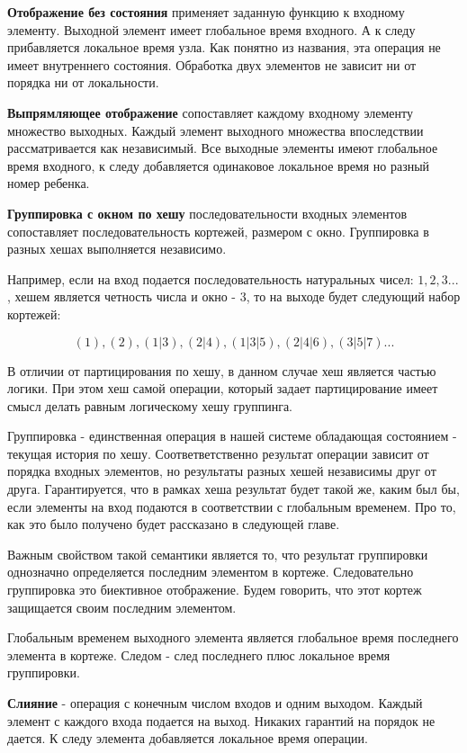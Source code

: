 \documentclass[14pt]{matmex-diploma-custom}
\begin{document}
\textbf{Отображение без состояния} применяет заданную функцию к входному элементу. Выходной элемент имеет глобальное время входного. А к следу прибавляется локальное время узла. Как понятно из названия, эта операция не имеет внутреннего состояния. Обработка двух элементов не зависит ни от порядка ни от локальности.

\textbf{Выпрямляющее отображение} сопоставляет каждому входному элементу множество выходных. Каждый элемент выходного множества впоследствии рассматривается как независимый. Все выходные элементы имеют глобальное время входного, к следу добавляется одинаковое локальное время но разный номер ребенка.

\textbf{Группировка с окном по хешу} последовательности входных элементов сопоставляет последовательность кортежей, размером с окно. Группировка в разных хешах выполняется независимо.

Например, если на вход подается последовательность натуральных чисел: \(1, 2, 3...\) , хешем является четность числа и окно - 3, то на выходе будет следующий набор кортежей:

\[(1), (2), (1|3), (2|4), (1|3|5), (2|4|6), (3|5|7)...\]

В отличии от партицирования по хешу, в данном случае хеш является частью логики. При этом хеш самой операции, который задает партицирование имеет смысл делать равным логическому хешу группинга.

Группировка - единственная операция в нашей системе обладающая состоянием - текущая история по хешу. Соответветственно результат операции зависит от порядка входных элементов, но результаты разных хешей независимы друг от друга. Гарантируется, что в рамках хеша результат будет такой же, каким был бы, если элементы на вход подаются в соответствии с глобальным временем. Про то, как это было получено будет рассказано в следующей главе.

Важным свойством такой семантики является то, что результат группировки однозначно определяется последним элементом в кортеже. Следовательно группировка это биективное отображение. Будем говорить, что этот кортеж защищается своим последним элементом.

Глобальным временем выходного элемента является глобальное время последнего элемента в кортеже. Следом - след последнего плюс локальное время группировки.

\textbf{Слияние} - операция с конечным числом входов и одним выходом. Каждый элемент с каждого входа подается на выход. Никаких гарантий на порядок не дается. К следу элемента добавляется локальное время операции.
\end{document}
